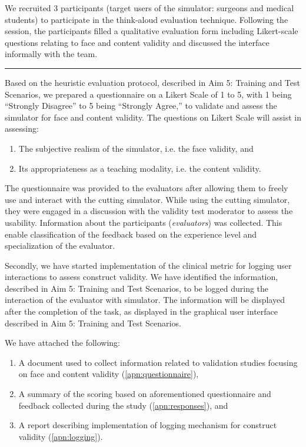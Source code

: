 We recruited 3 participants (target users of the simulator: surgeons and medical students) to participate in the think-aloud evaluation technique. Following the session, the participants filled a qualitative evaluation form including Likert-scale questions relating to face and content validity and discussed the interface informally with the team.

\hrule%

Based on the heuristic evaluation protocol, described in Aim 5: Training and Test Scenarios, we prepared a questionnaire on a Likert Scale of 1 to 5, with 1 being ``Strongly Disagree'' to 5 being ``Strongly Agree,'' to validate and assess the simulator for face and content validity. The questions on Likert Scale will assist in assessing:
\begin{enumerate}[\em i\em)]
  \item The subjective realism of the simulator, i.e. the face validity, and
  \item Its appropriateness as a teaching modality, i.e. the content validity.
\end{enumerate}

The questionnaire was provided to the evaluators after allowing them to freely use and interact with the cutting simulator. While using the cutting simulator, they were engaged in a discussion with the validity test moderator to assess the usability. Information about the participants (\emph{evaluators}) was collected. This enable classification of the feedback based on the experience level and specialization of the evaluator.

Secondly, we have started implementation of the clinical metric for logging user interactions to assess construct validity. We have identified the information, described in Aim 5: Training and Test Scenarios, to be logged during the interaction of the evaluator with simulator. The information will be displayed after the completion of the task, as displayed in the graphical user interface described in Aim 5: Training and Test Scenarios.

We have attached the following:
\begin{enumerate}[1.]
  \item A document used to collect information related to validation studies focusing on face and content validity (\autoref{apn:questionnaire}),
  \item A summary of the scoring based on aforementioned questionnaire and feedback collected during the study (\autoref{apn:responses}), and
  \item A report describing implementation of logging mechanism for construct validity (\autoref{apn:logging}).
\end{enumerate}

\clearpage%

